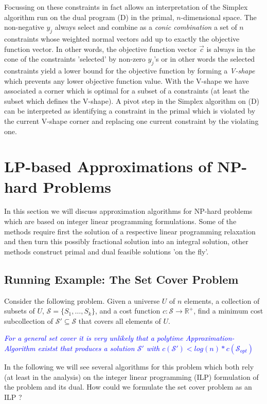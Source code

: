 \documentclass{article}
\begin{document}
Focussing on these constraints in fact allows an interpretation of the Simplex algorithm run on the dual program (D) in the primal, $n$-dimensional space. The non-negative $y_j$ always select and combine as a \emph{conic combination} a set of $n$ constraints whose weighted normal vectors add up to exactly the objective function vector. In other words, the objective function vector $\overrightarrow{c}$ is always in the cone of the constraints 'selected' by non-zero $y_j$'s or in other words the selected constraints yield a lower bound for the objective function by forming a \emph{V-shape} which prevents any lower objective function value. 
With the V-shape we have associated a corner which is optimal for a subset of a constraints (at least the subset which defines the V-shape). A pivot step in the Simplex algorithm on (D) can be interpreted as identifying a constraint in the primal which is violated by the current V-shape corner and replacing one current constraint by the violating one.


\newpage

\section{LP-based Approximations of NP-hard Problems}
In this section we will discuss approximation algorithms for NP-hard problems which are based on integer linear programming formulations. Some of the methods require first the solution of a respective linear programming relaxation and then turn this possibly fractional solution into an integral solution, other methods construct primal and dual feasible solutions 'on the fly'.
 
\subsection{Running Example: The Set Cover Problem}
Consider the following problem. Given a universe $U$ of $n$ elements, a collection of subsets of $U$,
$\mathcal{S}=\{S_1, \dots, S_k\}$, and a cost function $c: \mathcal{S} \rightarrow \mathbb{R}^+$, find a minimum cost
subcollection of $\mathcal{S}' \subseteq \mathcal{S}$ that covers all elements of $U$.

\textcolor{blue}{\emph{For a general set cover it is very unlikely that a polytime Approximation-Algorithm existst that produces a solution $\mathcal{S}'$ with $c(\mathcal{S}') < log(n) * c(\mathcal{S}_{opt})$}}

In the following we will see several algorithms for this problem which both rely (at least in the analysis) on the
integer linear programming (ILP) formulation of the problem and its dual. How could we formulate the set cover problem 
as an ILP ?
\end{document}
